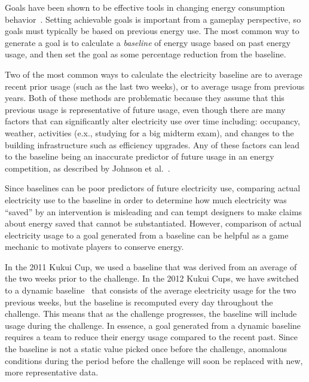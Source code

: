 \documentclass{sigchi}
\begin{document}
Goals have been shown to be effective tools in changing energy consumption behavior~\cite{Becker78, Houwelingen89}. Setting achievable goals is important from a gameplay perspective, so goals must typically be based on previous energy use. The most common way to generate a goal is to calculate a \emph{baseline} of energy usage based on past energy usage, and then set the goal as some percentage reduction from the baseline.

Two of the most common ways to calculate the electricity baseline are to average recent prior usage (such as the last two weeks), or to average usage from previous years. Both of these methods are problematic because they assume that this previous usage is representative of future usage, even though there are many factors that can significantly alter electricity use over time including: occupancy, weather, activities (e.x., studying for a big midterm exam), and changes to the building infrastructure such as efficiency upgrades. Any of these factors can lead to the baseline being an inaccurate predictor of future usage in an energy competition, as described by Johnson et al.~\cite{csdl2-12-08}.

Since baselines can be poor predictors of future electricity use, comparing actual electricity use to the baseline in order to determine how much electricity was ``saved'' by an intervention is misleading and can tempt designers to make claims about energy saved that cannot be substantiated. However, comparison of actual electricity usage to a goal generated from a baseline can be helpful as a game mechanic to motivate players to conserve energy.

In the 2011 Kukui Cup, we used a baseline that was derived from an average of the two weeks prior to the challenge. In the 2012 Kukui Cups, we have switched to a dynamic baseline~\cite{csdl2-12-08} that consists of the average electricity usage for the two previous weeks, but the baseline is recomputed every day throughout the challenge. This means that as the challenge progresses, the baseline will include usage during the challenge. In essence, a goal generated from a dynamic baseline requires a team to reduce their energy usage compared to the recent past. Since the baseline is not a static value picked once before the challenge, anomalous conditions during the period before the challenge will soon be replaced with new, more representative data.
\end{document}
